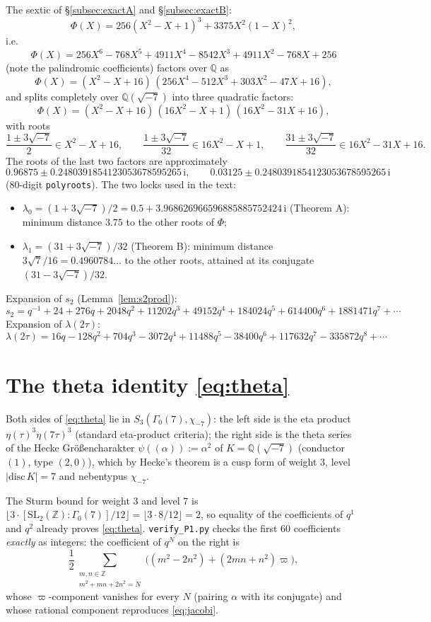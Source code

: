 \documentclass[11pt]{article}
\theoremstyle{definition}
\theoremstyle{remark}
\newcommand{\Qq}{\mathbb{Q}}
\newcommand{\Zz}{\mathbb{Z}}
\newcommand{\ii}{\mathrm{i}}
\newcommand{\m}{\mathrm{m}}
\begin{document}
The sextic of \S\ref{subsec:exactA} and \S\ref{subsec:exactB}:
\[
  \Phi(X)=256(X^2-X+1)^3+3375X^2(1-X)^2,
\]
i.e.\
\[
  \Phi(X)=256X^6-768X^5+4911X^4-8542X^3+4911X^2-768X+256
\]
(note the palindromic coefficients) factors over $\Qq$ as
\[
  \Phi(X)=(X^2-X+16)\,(256X^4-512X^3+303X^2-47X+16),
\]
and splits completely over $\Qq(\sqrt{-7})$ into three quadratic factors:
\[
  \Phi(X)=(X^2-X+16)\,(16X^2-X+1)\,(16X^2-31X+16),
\]
with roots
\[
  \frac{1\pm3\sqrt{-7}}2\in X^2-X+16,\qquad
  \frac{1\pm3\sqrt{-7}}{32}\in 16X^2-X+1,\qquad
  \frac{31\pm3\sqrt{-7}}{32}\in 16X^2-31X+16 .
\]
The roots of the last two factors are approximately
\[
  0.96875\pm0.2480391854123053678595265\,\ii,\qquad
  0.03125\pm0.2480391854123053678595265\,\ii
\]
(80-digit \texttt{polyroots}). The two locks used in the text:
\begin{itemize}
\item $\lambda_0=(1+3\sqrt{-7})/2=0.5+3.968626966596885885752424\,\ii$
  (Theorem A): minimum distance $3.75$ to the other roots of $\Phi$;
\item $\lambda_1=(31+3\sqrt{-7})/32$ (Theorem B): minimum distance
  $3\sqrt7/16=0.4960784\ldots$ to the other roots, attained at its
  conjugate $(31-3\sqrt{-7})/32$.
\end{itemize}
Expansion of $s_2$ (Lemma~\ref{lem:s2prod}):
\[
  s_2=q^{-1}+24+276q+2048q^2+11202q^3+49152q^4+184024q^5+614400q^6+1881471q^7+\cdots
\]
Expansion of $\lambda(2\tau)$:
\[
  \lambda(2\tau)=16q-128q^2+704q^3-3072q^4+11488q^5-38400q^6+117632q^7-335872q^8+\cdots
\]

\section{The theta identity \texorpdfstring{\eqref{eq:theta}}{(theta)}}\label{app:theta}

Both sides of \eqref{eq:theta} lie in $S_3(\Gamma_0(7),\chi_{-7})$: the left
side is the eta product $\eta(\tau)^3\eta(7\tau)^3$ (standard eta-product
criteria); the right side is the theta series of the Hecke
Gr\"o\ss encharakter $\psi((\alpha)):=\alpha^2$ of $K=\Qq(\sqrt{-7})$
(conductor $(1)$, type $(2,0)$), which by Hecke's theorem is a cusp form of
weight $3$, level $|\mathrm{disc}\,K|=7$ and nebentypus $\chi_{-7}$.

The Sturm bound for weight $3$ and level $7$ is
$\lfloor 3\cdot[\mathrm{SL}_2(\Zz):\Gamma_0(7)]/12\rfloor=\lfloor 3\cdot8/12\rfloor=2$,
so equality of the coefficients of $q^1$ and $q^2$ already proves
\eqref{eq:theta}. \texttt{verify\_P1.py} checks the first 60 coefficients
\emph{exactly} as integers: the coefficient of $q^N$ on the right is
\[
  \frac12\sum_{\substack{m,n\in\Zz\\m^2+mn+2n^2=N}}\bigl((m^2-2n^2)+(2mn+n^2)\varpi\bigr),
\]
whose $\varpi$-component vanishes for every $N$ (pairing $\alpha$ with its
conjugate) and whose rational component reproduces \eqref{eq:jacobi}.
\end{document}
